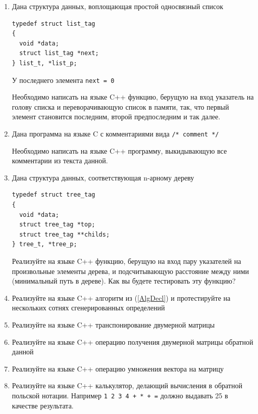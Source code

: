 \documentclass[a4paper,12pt,oneside]{article}
\begin{document}
\begin{enumerate}
\item
Дана структура данных, воплощающая простой односвязный список

\begin{lstlisting}
typedef struct list_tag
{
  void *data;
  struct list_tag *next;
} list_t, *list_p;
\end{lstlisting}

У последнего элемента \lstinline!next = 0!

Необходимо написать на языке C++ функцию, берущую на вход указатель на голову списка и переворачивающую список в памяти, так, что первый элемент становится последним, второй предпоследним и так далее.

\item
Дана программа на языке C с комментариями вида \lstinline!/* comment */!

Необходимо написать на языке C++ программу, выкидывающую все комментарии из текста данной.

\item
Дана структура данных, соответствующая n-арному дереву

\begin{lstlisting}
typedef struct tree_tag
{
  void *data;
  struct tree_tag *top;
  struct tree_tag **childs;
} tree_t, *tree_p;
\end{lstlisting}

Реализуйте на языке C++ функцию, берущую на вход пару указателей на произвольные элементы дерева, и подсчитывающую расстояние между ними (минимальный путь в дереве). Как вы будете тестировать эту функцию?

\item
Реализуйте на языке C++ алгоритм из (\ref{AlgDecl}) и протестируйте на нескольких сотнях сгенерированных определений

\item
Реализуйте на языке C++ транспонирование двумерной матрицы

\item
Реализуйте на языке C++ операцию получения двумерной матрицы обратной данной

\item
Реализуйте на языке C++ операцию умножения вектора на матрицу

\item
Реализуйте на языке C++ калькулятор, делающий вычисления в обратной польской нотации. Например \lstinline!1 2 3 4 + * + =! должно выдавать 25 в качестве результата.


\end{enumerate}
\end{document}
